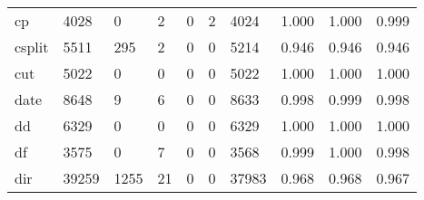 \begin{longtable}{lp{1.3cm}p{1.3cm}p{1.3cm}p{1.3cm}p{1.3cm}p{1.3cm}p{1.3cm}p{1.3cm}p{1.3cm}}
cp        &                   4028 &                                  0 &                                 2 &                                0 &                                 2 &                            4024 &                                   1.000 &                                  1.000 &                                0.999 \\
csplit    &                   5511 &                                295 &                                 2 &                                0 &                                 0 &                            5214 &                                   0.946 &                                  0.946 &                                0.946 \\
cut       &                   5022 &                                  0 &                                 0 &                                0 &                                 0 &                            5022 &                                   1.000 &                                  1.000 &                                1.000 \\
date      &                   8648 &                                  9 &                                 6 &                                0 &                                 0 &                            8633 &                                   0.998 &                                  0.999 &                                0.998 \\
dd        &                   6329 &                                  0 &                                 0 &                                0 &                                 0 &                            6329 &                                   1.000 &                                  1.000 &                                1.000 \\
df        &                   3575 &                                  0 &                                 7 &                                0 &                                 0 &                            3568 &                                   0.999 &                                  1.000 &                                0.998 \\
dir       &                  39259 &                               1255 &                                21 &                                0 &                                 0 &                           37983 &                                   0.968 &                                  0.968 &                                0.967 \\

\end{longtable}
